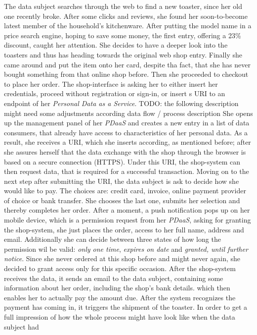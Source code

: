 \documentclass[12pt,english,a4paper,titlepage,cleardoublepage=empty,dottedtoc]{report}
\begin{document}
The data subject searches through the web to find a new toaster, since
her old one recently broke. After some clicks and reviews, she found her
soon-to-become latest member of the household's kitchenware. After
putting the model name in a price search engine, hoping to save some
money, the first entry, offering a 23\% discount, caught her attention.
She decides to have a deeper look into the toasters and thus has heading
towards the original web shop entry. Finally she came around and put the
item onto her card, despite tha fact, that she has never bought
something from that online shop before. Then she proceeded to checkout
to place her order. The shop-interface is asking her to either insert
her credentials, proceed without registration or sign-in, or insert s
URI to an endpoint of her \emph{Personal Data as a Service}. TODO: the
following description might need some adjustments according data flow /
process description She opens up the management panel of her
\emph{PDaaS} and creates a new entry in a list of data consumers, that
already have access to characteristics of her personal data. As a
result, she receives a URI, which she inserts according, as mentioned
before; after she assures herself that the data exchange with the shop
through the browser is based on a secure connection (HTTPS). Under this
URI, the shop-system can then request data, that is required for a
successful transaction. Moving on to the next step after submitting the
URI, the data subject is ask to decide how she would like to pay. The
choices are: credit card, invoice, online payment provider of choice or
bank transfer. She chooses the last one, submits her selection and
thereby completes her order. After a moment, a push notification pops up
on her mobile device, which is a permission request from her
\emph{PDaaS}, asking for granting the shop-system, she just places the
order, access to her full name, address and email. Additionally she can
decide between three states of how long the permission wil be valid:
\emph{only one time}, \emph{expires on date} and \emph{granted, until
further notice}. Since she never ordered at this shop before and might
never again, she decided to grant access only for this specific
occasion. After the shop-system receives the data, it sends an email to
the data subject, containing some information about her order, including
the shop's bank details. which then enables her to actually pay the
amount due. After the system recognizes the payment has coming in, it
triggers the shipment of the toaster. In order to get a full impression
of how the whole process might have look like when the data subject had
\end{document}
